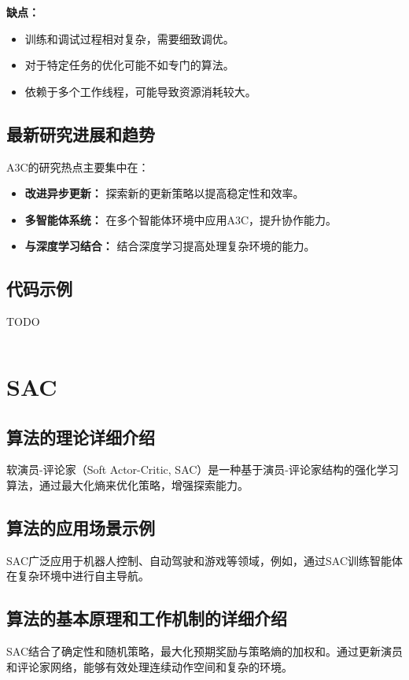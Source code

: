 \textbf{缺点：}
\begin{itemize}
    \item 训练和调试过程相对复杂，需要细致调优。
    \item 对于特定任务的优化可能不如专门的算法。
    \item 依赖于多个工作线程，可能导致资源消耗较大。
\end{itemize}

\subsection*{最新研究进展和趋势}
A3C的研究热点主要集中在：
\begin{itemize}
    \item \textbf{改进异步更新：} 探索新的更新策略以提高稳定性和效率。
    \item \textbf{多智能体系统：} 在多个智能体环境中应用A3C，提升协作能力。
    \item \textbf{与深度学习结合：} 结合深度学习提高处理复杂环境的能力。
\end{itemize}
\subsection*{代码示例}
TODO
\begin{lstlisting}

\end{lstlisting}


\section{SAC}
\subsection*{算法的理论详细介绍}
软演员-评论家（Soft Actor-Critic, SAC）是一种基于演员-评论家结构的强化学习算法，通过最大化熵来优化策略，增强探索能力。

\subsection*{算法的应用场景示例}
SAC广泛应用于机器人控制、自动驾驶和游戏等领域，例如，通过SAC训练智能体在复杂环境中进行自主导航。

\subsection*{算法的基本原理和工作机制的详细介绍}
SAC结合了确定性和随机策略，最大化预期奖励与策略熵的加权和。通过更新演员和评论家网络，能够有效处理连续动作空间和复杂的环境。

